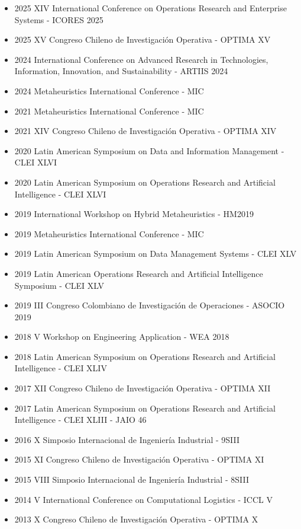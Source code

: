 {\begin{itemize}
    \item 2025 XIV International Conference on Operations Research and Enterprise Systems - ICORES 2025
    \item 2025 XV Congreso Chileno de Investigaci\'on Operativa - OPTIMA XV
    \item 2024 International Conference on Advanced Research in Technologies, Information, Innovation, and Sustainability - ARTIIS 2024
    \item 2024 Metaheuristics International Conference - MIC
    \item 2021 Metaheuristics International Conference - MIC
    \item 2021 XIV Congreso Chileno de Investigaci\'on Operativa - OPTIMA XIV
    \item 2020 Latin American Symposium on Data and Information Management - CLEI XLVI
    \item 2020 Latin American Symposium on Operations Research and Artificial Intelligence - CLEI XLVI
    \item 2019 International Workshop on Hybrid Metaheuristics - HM2019
    \item 2019 Metaheuristics International Conference - MIC
    \item 2019 Latin American Symposium on Data Management Systems - CLEI XLV
    \item 2019 Latin American Operations Research and Artificial Intelligence Symposium - CLEI XLV
    \item 2019 III Congreso Colombiano de Investigaci\'on de Operaciones - ASOCIO 2019
    \item 2018 V Workshop on Engineering Application - WEA 2018
    \item 2018 Latin American Symposium on Operations Research and Artificial Intelligence - CLEI XLIV
    \item 2017 XII Congreso Chileno de Investigaci\'on Operativa - OPTIMA XII
    \item 2017 Latin American Symposium on Operations Research and Artificial Intelligence - CLEI XLIII - JAIO 46
    \item 2016 X Simposio Internacional de Ingenier\'ia Industrial - 9SIII
    \item 2015 XI Congreso Chileno de Investigaci\'on Operativa - OPTIMA XI
    \item 2015 VIII Simposio Internacional de Ingenier\'ia Industrial - 8SIII
    \item 2014 V International Conference on Computational Logistics - ICCL V
    \item 2013 X Congreso Chileno de Investigaci\'on Operativa - OPTIMA X
\end{itemize}
}

\clearpage
